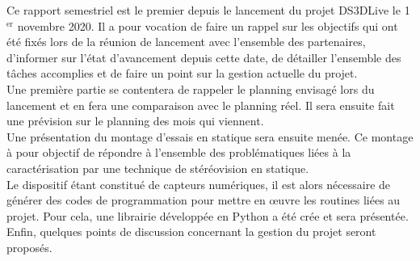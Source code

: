 \documentclass[a4paper, 11pt]{article}
\begin{document}
\newpage\null
\newpage
\tableofcontents

\newpage
Ce rapport semestriel est le premier depuis le lancement du projet DS3DLive le 1$^\text{er}$ novembre 2020. Il a pour vocation de faire un rappel sur les objectifs qui ont été fixés lors de la réunion de lancement avec l'ensemble des partenaires, d'informer sur l'état d'avancement depuis cette date, de détailler l'ensemble des tâches accomplies et de faire un point sur la gestion actuelle du projet.
\\Une première partie se contentera de rappeler le planning envisagé lors du lancement et en fera une comparaison avec le planning réel. Il sera ensuite fait une prévision sur le planning des mois qui viennent.
\\Une présentation du montage d'essais en statique sera ensuite menée. Ce montage à pour objectif de répondre à l'ensemble des problématiques liées à la caractérisation par une technique de stéréovision en statique.
\\Le dispositif étant constitué de capteurs numériques, il est alors nécessaire de générer des codes de programmation pour mettre en \oe{}uvre les routines liées au projet. Pour cela, une librairie développée en Python a été crée et sera présentée.
\\Enfin, quelques points de discussion concernant la gestion du projet seront proposés.
	
	
\end{document}
